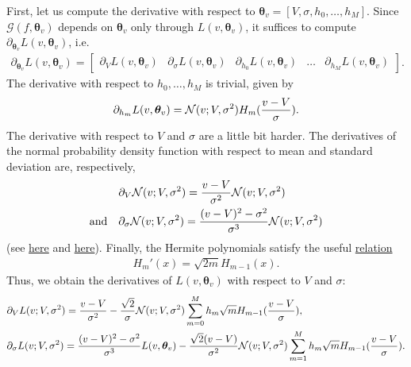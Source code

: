 \documentclass{article}
\numberwithin{equation}{section}
\theoremstyle{nonumberplain}
\newcommand{\forward}{\bm {\mathcal G}}
\newcommand{\tv}{\bm \theta_v}
\begin{document}
First, let us compute the derivative with respect to $\bm \theta_v = [V, \sigma, h_0, \ldots, h_M]$. Since $\forward(f, \tv)$ depends on $\tv$ only through $L(v,\tv)$, it suffices to compute $\partial_{\tv} L(v,\tv)$, i.e.
\begin{align*}
\partial_{\tv} L(v, \tv) = \begin{bmatrix}
\partial_V L(v,\tv) & \partial_\sigma L(v,\tv) & \partial_{h_0} L(v,\tv) & \hdots & \partial_{h_M} L(v,\tv)
\end{bmatrix}.
\end{align*}
The derivative with respect to $h_0,\ldots,h_M$ is trivial, given by
\begin{align*}
\partial_{h_m} L(v,\tv) = \normal(v;V,\sigma^2) H_m(\frac{v-V}{\sigma}).
\end{align*}
The derivative with respect to $V$ and $\sigma$ are a little bit harder. The derivatives of the normal probability density function with respect to mean and standard deviation are, respectively,
\begin{align*}
& \partial_V \mathcal{N}(v; V, \sigma^2) = \frac{v-V}{\sigma^2} \mathcal{N}(v;V,\sigma^2)\\
\text{and} \quad & \partial_\sigma \mathcal{N}(v; V, \sigma^2) = \frac{(v-V)^2-\sigma^2}{\sigma^3} \mathcal{N}(v;V,\sigma^2)
\end{align*}
(see \href{https://www.wolframalpha.com/input/?i=derivative&assumption=%7B%22C%22%2C+%22derivative%22%7D+-%3E+%7B%22Calculator%22%7D&assumption=%7B%22F%22%2C+%22Derivative%22%2C+%22derivativefunction%22%7D+-%3E%22exp%28+-%28v-V%29%5E2%2F%282*s%5E2%29%29+%2F+sqrt%282*pi*s%5E2%29%22&assumption=%7B%22F%22%2C+%22Derivative%22%2C+%22derivativevariable%22%7D+-%3E%22V%22}{here} and \href{https://www.wolframalpha.com/input/?i=derivative&assumption=%7B%22C%22%2C+%22derivative%22%7D+-%3E+%7B%22Calculator%22%7D&assumption=%7B%22F%22%2C+%22Derivative%22%2C+%22derivativefunction%22%7D+-%3E%22exp%28+-%28v-V%29%5E2%2F%282*s%5E2%29%29+%2F+sqrt%282*pi*s%5E2%29%22&assumption=%7B%22F%22%2C+%22Derivative%22%2C+%22derivativevariable%22%7D+-%3E%22s%22}{here}). Finally, the Hermite polynomials satisfy the useful \href{https://en.wikipedia.org/wiki/Hermite_polynomials#Recurrence_relation}{relation}
\begin{align}
H_m'(x) = \sqrt{2m} H_{m-1}(x). \label{eq:hermiteReccurence}
\end{align}
Thus, we obtain the derivatives of $L(v, \tv)$ with respect to $V$ and $\sigma$:
\begin{align*}
& \partial_V L(v; V,\sigma^2) = \frac{v-V}{\sigma^2} - \frac{\sqrt 2}{\sigma} \normal(v; V, \sigma^2) \sum_{m=0}^M h_m \sqrt m H_{m-1}(\frac{v-V}{\sigma}), \\
& \partial_\sigma L(v; V, \sigma^2) = \frac{(v-V)^2-\sigma^2}{\sigma^3} L(v, \tv) - \frac{\sqrt 2 (v-V)}{\sigma^2} \normal(v; V,\sigma^2) \sum_{m=1}^M h_m \sqrt m H_{m-1}(\frac{v-V}{\sigma}).
\end{align*}
\end{document}
